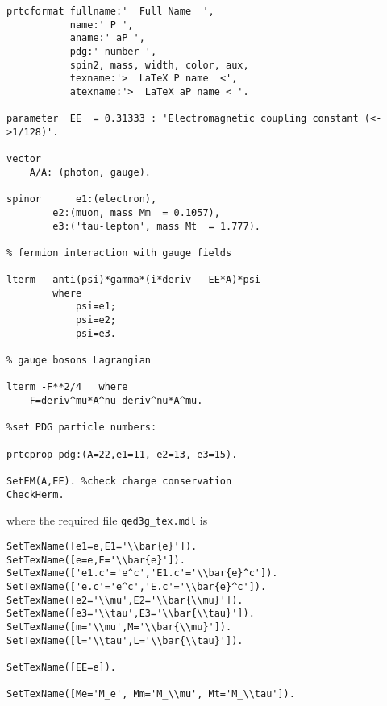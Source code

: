 \begin{frame}{}
\begin{lstlisting}
prtcformat fullname:'  Full Name  ',
           name:' P ',
           aname:' aP ',
           pdg:' number ',
           spin2, mass, width, color, aux,
           texname:'>  LaTeX P name  <',
           atexname:'>  LaTeX aP name < '.

parameter  EE  = 0.31333 : 'Electromagnetic coupling constant (<->1/128)'.

vector  
	A/A: (photon, gauge).

spinor 		e1:(electron),
		e2:(muon, mass Mm  = 0.1057),
		e3:('tau-lepton', mass Mt  = 1.777).

% fermion interaction with gauge fields

lterm  	anti(psi)*gamma*(i*deriv - EE*A)*psi
		where 
			psi=e1;
			psi=e2;
			psi=e3.

% gauge bosons Lagrangian

lterm -F**2/4   where 
	F=deriv^mu*A^nu-deriv^nu*A^mu.

%set PDG particle numbers:

prtcprop pdg:(A=22,e1=11, e2=13, e3=15).

SetEM(A,EE). %check charge conservation
CheckHerm.
\end{lstlisting}
where the required file \lstinline{qed3g_tex.mdl} is
\begin{lstlisting}
SetTexName([e1=e,E1='\\bar{e}']).
SetTexName([e=e,E='\\bar{e}']).
SetTexName(['e1.c'='e^c','E1.c'='\\bar{e}^c']).
SetTexName(['e.c'='e^c','E.c'='\\bar{e}^c']).
SetTexName([e2='\\mu',E2='\\bar{\\mu}']).
SetTexName([e3='\\tau',E3='\\bar{\\tau}']).
SetTexName([m='\\mu',M='\\bar{\\mu}']).
SetTexName([l='\\tau',L='\\bar{\\tau}']).

SetTexName([EE=e]).

SetTexName([Me='M_e', Mm='M_\\mu', Mt='M_\\tau']).
\end{lstlisting}


\end{frame}
